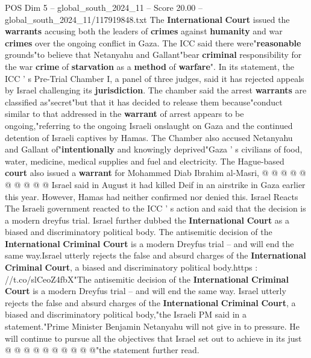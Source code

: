 \begin{textsample}{POS Dim 5 – global\_south\_2024\_11 – Score 20.00 – global\_south\_2024\_11/117919848.txt}  \label{ex:f5_pos_026}
The \textbf{International} \textbf{Court} issued the \textbf{warrants} accusing both the leaders of \textbf{crimes} against \textbf{humanity} and war \textbf{crimes} over the ongoing conflict in Gaza.
The ICC said there were"\textbf{reasonable} grounds"to believe that Netanyahu and Gallant"bear \textbf{criminal} responsibility for the war \textbf{crime} of \textbf{starvation} as a \textbf{method} of \textbf{warfare}".
In its statement, the ICC ' s Pre-Trial Chamber I, a panel of three judges, said it has rejected appeals by Israel challenging its \textbf{jurisdiction}.
The chamber said the arrest \textbf{warrants} are classified as"secret"but that it has decided to release them because"conduct similar to that addressed in the \textbf{warrant} of arrest appears to be ongoing,"referring to the ongoing Israeli onslaught on Gaza and the continued detention of Israeli captives by Hamas.
The Chamber also accused Netanyahu and Gallant of"\textbf{intentionally} and knowingly deprived"Gaza ' s civilians of food, water, medicine, medical supplies and fuel and electricity.
The Hague-based \textbf{court} also issued a \textbf{warrant} for Mohammed Diab Ibrahim al-Masri, @ @ @ @ @ @ @ @ @ @ Israel said in August it had killed Deif in an airstrike in Gaza earlier this year.
However, Hamas had neither confirmed nor denied this.
Israel Reacts The Israeli government reacted to the ICC ' s action and said that the decision is a modern dreyfus trial.
Israel further dubbed the \textbf{International} \textbf{Court} as a biased and discriminatory political body.
The antisemitic decision of the \textbf{International} \textbf{Criminal} \textbf{Court} is a modern Dreyfus trial -- and will end the same way.Israel utterly rejects the false and absurd charges of the \textbf{International} \textbf{Criminal} \textbf{Court}, a biased and discriminatory political body.https : //t.co/slCeoZ4fbX"The antisemitic decision of the \textbf{International} \textbf{Criminal} \textbf{Court} is a modern Dreyfus trial -- and will end the same way.
Israel utterly rejects the false and absurd charges of the \textbf{International} \textbf{Criminal} \textbf{Court}, a biased and discriminatory political body,"the Israeli PM said in a statement."Prime Minister Benjamin Netanyahu will not give in to pressure.
He will continue to pursue all the objectives that Israel set out to achieve in its just @ @ @ @ @ @ @ @ @ @"the statement further read.

\end{textsample}
